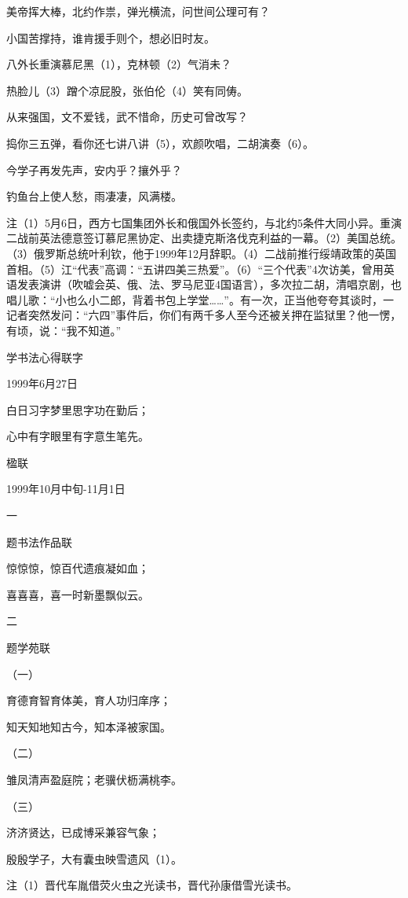 \documentclass[../../dazhuan.tex]{subfiles}
\begin{document}
美帝挥大棒，北约作祟，弹光横流，问世间公理可有？

小国苦撑持，谁肯援手则个，想必旧时友。

八外长重演慕尼黑（1），克林顿（2）气消未？

热脸儿（3）蹭个凉屁股，张伯伦（4）笑有同俦。

从来强国，文不爱钱，武不惜命，历史可曾改写？

捣你三五弹，看你还七讲八讲（5），欢颜吹唱，二胡演奏（6）。

今学子再发先声，安内乎？攘外乎？

钓鱼台上使人愁，雨凄凄，风满楼。

注（1）5月6日，西方七国集团外长和俄国外长签约，与北约5条件大同小异。重演二战前英法德意签订慕尼黑协定、出卖捷克斯洛伐克利益的一幕。（2）美国总统。（3）俄罗斯总统叶利钦，他于1999年12月辞职。（4）二战前推行绥靖政策的英国首相。（5）江“代表”高调：“五讲四美三热爱”。（6）“三个代表”4次访美，曾用英语发表演讲（吹嘘会英、俄、法、罗马尼亚4国语言），多次拉二胡，清唱京剧，也唱儿歌：“小也么小二郎，背着书包上学堂……”。有一次，正当他夸夸其谈时，一记者突然发问：“六四”事件后，你们有两千多人至今还被关押在监狱里？他一愣，有顷，说：“我不知道。”



学书法心得联字

1999年6月27日

白日习字梦里思字功在勤后；

心中有字眼里有字意生笔先。



楹联

1999年10月中旬-11月1日

一

题书法作品联

惊惊惊，惊百代遗痕凝如血；

喜喜喜，喜一时新墨飘似云。

二

题学苑联

（一）

育德育智育体美，育人功归庠序；

知天知地知古今，知本泽被家国。

（二）

雏凤清声盈庭院；老骥伏枥满桃李。

（三）

济济贤达，已成博采兼容气象；

殷殷学子，大有囊虫映雪遗风（1）。

注（1）晋代车胤借荧火虫之光读书，晋代孙康借雪光读书。
\end{document}
